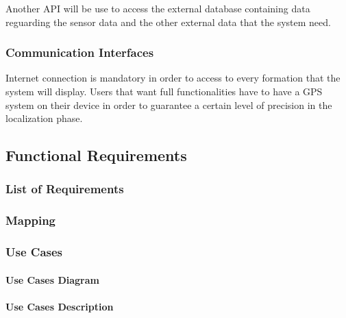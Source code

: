 \documentclass[table, 12pt]{article}
\begin{document}
Another API will be use to access the external database containing data reguarding the sensor data and the other external data that the system need.

\subsubsection{Communication Interfaces}
Internet connection is mandatory in order to access to every formation that the system will display.
Users that want full functionalities have to have a GPS system on their device in order to guarantee a certain level of precision in the localization phase.

\subsection{Functional Requirements}

\subsubsection{List of Requirements}

\subsubsection{Mapping}

\subsubsection{Use Cases}
\setcounter{secnumdepth}{4}

    \paragraph{Use Cases Diagram}


    \paragraph{Use Cases Description}
    
\end{document}
